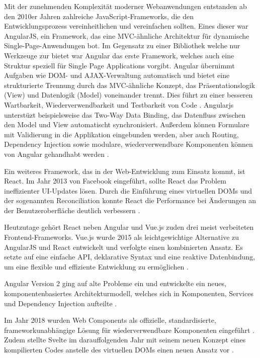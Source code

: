 \documentclass[oneside]{ausarbeitung}
\begin{document}
Mit der zunehmenden Komplexität moderner Webanwendungen entstanden ab den 2010er Jahren zahlreiche JavaScript-Frameworks, die den Entwicklungsprozess vereinheitlichen und vereinfachen sollten. 
Eines dieser war AngularJS, ein Framework, das eine MVC-ähnliche Architektur für dynamische Single-Page-Anwendungen bot. Im Gegensatz zu einer Bibliothek welche nur Werkzeuge zur  bietet war Angular das erste Framework, welches auch eine Struktur speziell für Single Page Applications vorgibt. Angular übernimmt Aufgaben wie DOM- und AJAX-Verwaltung automatisch und bietet eine strukturierte Trennung durch das MVC-ähnliche Konzept, das Präsentationslogik (View) und Datenlogik (Model) voneinander trennt. Dies führt zu einer besseren Wartbarkeit, Wiederverwendbarkeit und Testbarkeit von Code \parencite{what-is-angularjs}. Angularjs unterstüzt beispielsweise das Two-Way Data Binding, das Datenfluss zwischen den Model und View automatischt synchronisiert. Außerdem können Formulare mit Validierung in die Applikation eingebunden werden, aber auch Routing, Dependency Injection sowie modulare, wiederverwendbare Komponenten können von Angular gehandhabt werden \parencite{angular-history}. 


Ein weiteres Framework, das in der Web-Entwicklung zum Einsatz kommt, ist React. Im Jahr 2013 von Facebook eingeführt, sollte React das Problem ineffizienter UI-Updates lösen. Durch die Einführung eines virtuellen DOMs und der sogenannten Reconciliation konnte React die Performance bei Änderungen an der Benutzeroberfläche deutlich verbessern \parencite{hunt2013react}.

Heutzutage gehört React neben Angular und Vue.js zuden drei meist verbeiteten Frontend-Frameworks. Vue.js wurde 2015 als leichtgewichtige Alternative zu AngularJS und React entwickelt und verfolgte einen kombinierten Ansatz. 
Es setzte auf eine einfache API, deklarative Syntax und eine reaktive Datenbindung, um eine flexible und effiziente Entwicklung zu ermöglichen \parencite{vue-intro}. 

Angular Version 2 ging auf alte Probleme ein und entwickelte ein neues, komponentenbasiertes Architekturmodell, welches sich in Komponenten, Services und Dependency Injection aufteilte \parencite{angular-docs}. 

Im Jahr 2018 wurden Web Components als offizielle, standardisierte, frameworkunabhängige Lösung für wiederverwendbare Komponenten eingeführt \parencite{mdn-webcomponents}. 
Zudem stellte Svelte im darauffolgenden Jahr mit seinem neuen Konzept eines kompilierten Codes anstelle des virtuellen DOMs einen neuen Ansatz vor \parencite{svelte-intro}.
\end{document}
